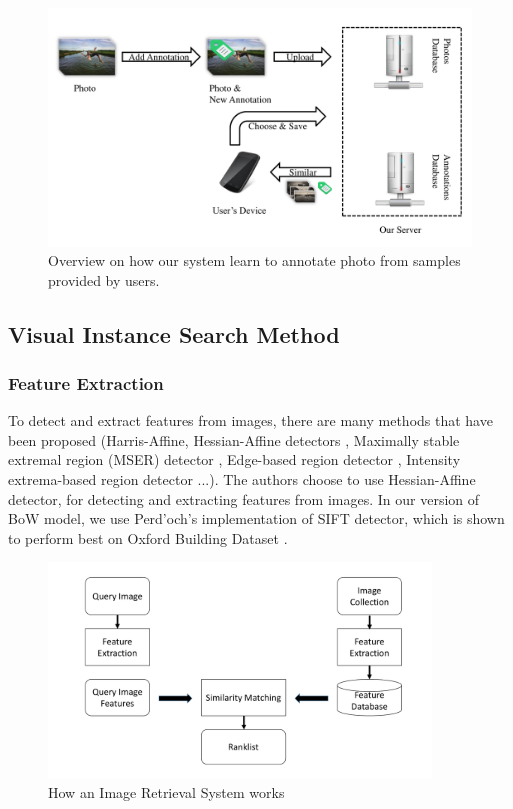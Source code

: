 \begin{figure}
    \centering
    \includegraphics[width=5.0in]{flow2.pdf}
    \caption{Overview on how our system learn to annotate photo from samples provided by users.}
    \label{fig:flow_2}
\end{figure}

\subsection{Visual Instance Search Method} \label{section:visual_search}
\subsubsection{Feature Extraction} \label{section:feature_extraction}

To detect and extract features from images, there are many methods that have been proposed (Harris-Affine, Hessian-Affine detectors \cite{Mikolajczyk2004}, Maximally stable extremal region (MSER) detector \cite{conf/bmvc/MatasCUP02}, Edge-based region detector \cite{Tuytelaars99content-basedimage}, Intensity extrema-based region detector \cite{Tuytelaars00widebaseline} ...). The authors choose to use Hessian-Affine detector, for detecting and extracting features from images. In our version of BoW model, we use Perd'och's implementation of SIFT detector, which is shown to perform best on Oxford Building Dataset \cite{perdoch}.

\begin{figure}
    \centering
    \includegraphics[width=4.0in]{ImageRetrievalSystem.pdf}
    \caption{How an Image Retrieval System works}
    \label{fig:image_retrieval_system}
\end{figure}

